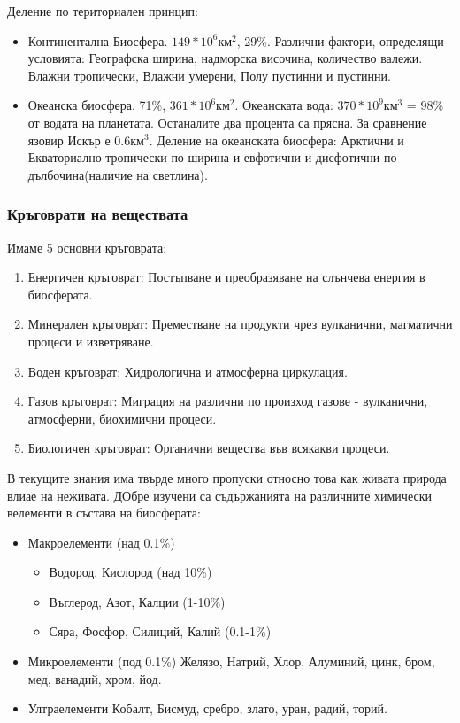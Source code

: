 \documentclass[12pt, a4paper]{article}
\begin{document}
Деление по териториален принцип:
\begin{itemize}
	\item Континентална Биосфера. $149*10^6 км^2$, 29\%. Различни фактори, определящи условията: Географска ширина, надморска височина, количество валежи. Влажни тропически, Влажни умерени, Полу пустинни и пустинни.
	\item Океанска биосфера. 71\%, $361*10^6 км^2$. Океанската вода: $370*10^9 км^3$ = 98\% от водата на планетата. Останалите два процента са прясна. За сравнение язовир Искър е $0.6 км^3$. Деление на океанската биосфера: Арктични и Екваториално-тропически по ширина и евфотични и дисфотични по дълбочина(наличие на светлина).
\end{itemize}

\subsubsection{Кръговрати на веществата}
Имаме 5 основни кръговрата:
\begin{enumerate}
	\item Енергичен кръговрат: Постъпване и преобразяване на слънчева енергия в биосферата.
	\item Минерален кръговрат: Преместване на продукти чрез вулканични, магматични процеси и изветряване.
	\item Воден кръговрат: Хидрологична и атмосферна циркулация.
	\item Газов кръговрат: Миграция на различни по произход газове - вулканични, атмосферни, биохимични процеси.
	\item Биологичен кръговрат: Органични вещества във всякакви процеси.
\end{enumerate}

В текущите знания има твърде много пропуски относно това как живата природа влиае на неживата. ДОбре изучени са съдържанията на различните химически велементи в състава на биосферата:
\begin{itemize}
	\item Макроелементи (над 0.1\%)
	\begin{itemize}
		\item Водород, Кислород (над 10\%)
		\item Въглерод, Азот, Калции (1-10\%)
		\item Сяра, Фосфор, Силиций, Калий (0.1-1\%)
	\end{itemize}
	\item Микроелементи (под 0.1\%)
	Желязо, Натрий, Хлор, Алуминий, цинк, бром, мед, ванадий, хром, йод.
	\item Ултраелементи
	Кобалт, Бисмуд, сребро, злато, уран, радий, торий.
\end{itemize}
\end{document}
